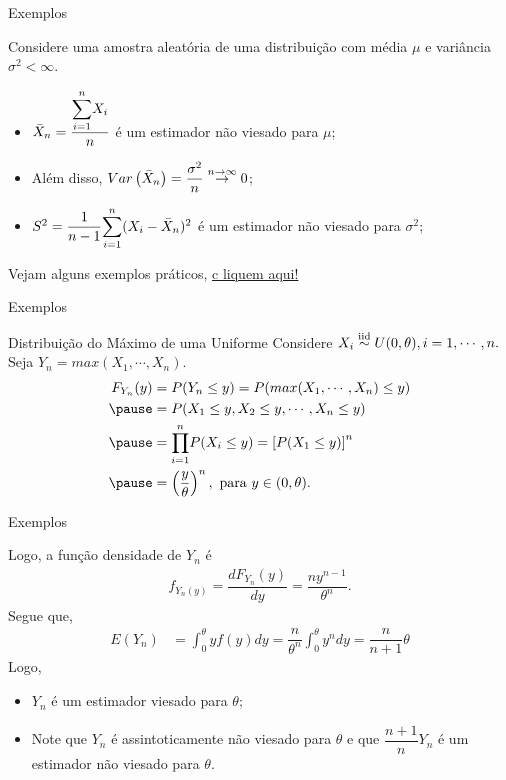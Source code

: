 \documentclass[12pt]{beamer}
\begin{document}
\begin{frame}{Exemplos}
    \begin{block}{}
\justifying
Considere \seqX uma amostra aleatória de uma distribuição com média $\mu$ e variância $\sigma^{2}<\infty.$
\begin{itemize}
    \item $\Bar{X}_{n}=\dfrac{{\displaystyle \sum_{i=1}^{n}} X_{i}}{n}$ é um estimador não viesado para $\mu$;
    \item Além disso, $Var\left(\Bar{X}_{n}\right)=\dfrac{\sigma^{2}}{n}\overset{n\rightarrow\infty}{\rightarrow}0$;
    \item $S^{2}=\dfrac{1}{n-1}{\displaystyle \sum_{i=1}^{n}}(X_{i}-\Bar{X}_{n})^{2}$ é um estimador não viesado para $\sigma^{2}$;
\end{itemize}
\end{block}
\pause
\begin{block}{}
	Vejam alguns exemplos práticos, \href{https://est711.shinyapps.io/EstimadoresViesados/}{c
		liquem aqui!}
\end{block}
\end{frame}

\begin{frame}{Exemplos}
    \begin{block}{Distribuição do Máximo de uma Uniforme}
\justifying
Considere $X_{i}\overset{\text{iid}}{\sim} U(0,\theta),i=1,\cdots,n.$ Seja $Y_{n}=max(X_{1},\cdots,X_{n}).$
\begin{align*}
    F_{Y_{n}}(y)&=P(Y_{n}\leq y)=P(max(X_{1},\cdots,X_{n})\leq y)\\
    \pause
    &=P(X_{1}\leq y,X_{2}\leq y,\cdots, X_{n}\leq y)\\
    \pause
    &=\Prodi P(X_{i}\leq y)=\left[P(X_{1}\leq y)\right]^{n}\\
    \pause
    &=\left(\dfrac{y}{\theta}\right)^{n},~\text{para}~y\in (0,\theta).
\end{align*}
\end{block}
\end{frame}

\begin{frame}{Exemplos}
\begin{block}{}
\justifying
Logo, a função densidade de $Y_{n}$ é
\begin{align*}
f_{Y_{n}(y)}=\dfrac{dF_{Y_{n}}(y)}{dy}=\dfrac{ny^{n-1}}{\theta^{n}}.
\end{align*}
Segue que, 
\begin{align*}
    E(Y_{n})&=\int_{0}^{\theta}yf(y)dy=\dfrac{n}{\theta^{n}}\int_{0}^{\theta}y^{n}dy=\dfrac{n}{n+1}\theta
\end{align*}
\pause
Logo, 
\begin{itemize}
    \item $Y_{n}$ é um estimador viesado para $\theta;$\pause
    \item Note que $Y_{n}$ é assintoticamente não viesado para $\theta$ e que $\dfrac{n+1}{n}Y_{n}$ é um estimador não viesado para $\theta.$
\end{itemize}
\end{block}
\end{frame}
\end{document}
